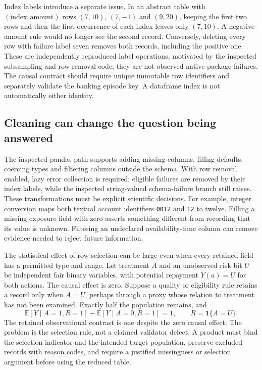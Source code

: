 Index labels introduce a separate issue. In an abstract table with
$(\text{index},\text{amount})$ rows $(7,10)$, $(7,-1)$ and $(9,20)$,
keeping the first two rows and then the first occurrence of each index leaves
only $(7,10)$. A negative-amount rule would no longer see the second record.
Conversely, deleting every row with failure label seven removes both records,
including the positive one. These are independently reproduced label
operations, motivated by the inspected subsampling and row-removal code;
they are not observed native package failures. The causal contract should
require unique immutable row identifiers and separately validate the banking
episode key. A dataframe index is not automatically either identity.
\citep{exec24_pandera_source,exec24_pandera_reference}

\subsection{Cleaning can change the question being answered}
The inspected pandas path supports adding missing columns, filling defaults,
coercing types and filtering columns outside the schema. With row removal
enabled, lazy error collection is required; eligible failures are removed by
their index labels, while the inspected string-valued schema-failure branch
still raises. These transformations must be explicit scientific decisions.
For example, integer conversion maps both textual account identifiers
\texttt{0012} and \texttt{12} to twelve. Filling a missing exposure field with
zero asserts something different from recording that its value is unknown.
Filtering an undeclared availability-time column can remove evidence needed
to reject future information.~\citep{exec24_pandera_source,exec24_pandera_reference}

The statistical effect of row selection can be large even when every
retained field has a permitted type and range. Let treatment $A$ and an
unobserved risk bit $U$ be independent fair binary variables, with potential
repayment $Y(a)=U$ for both actions. The causal effect is zero. Suppose a
quality or eligibility rule retains a record only when $A=U$, perhaps through
a proxy whose relation to treatment has not been examined. Exactly half the
population remains, and
\begin{equation}
 \mathbb E[Y\mid A=1,R=1]-\mathbb E[Y\mid A=0,R=1]=1,
 \qquad R=\mathbf1\{A=U\}.
\end{equation}
The retained observational contrast is one despite the zero causal effect.
The problem is the selection rule, not a claimed validator defect. A product
must bind the selection indicator and the intended target population, preserve
excluded records with reason codes, and require a justified missingness or
selection argument before using the reduced table.~\citep{exec24_pandera_reference}

